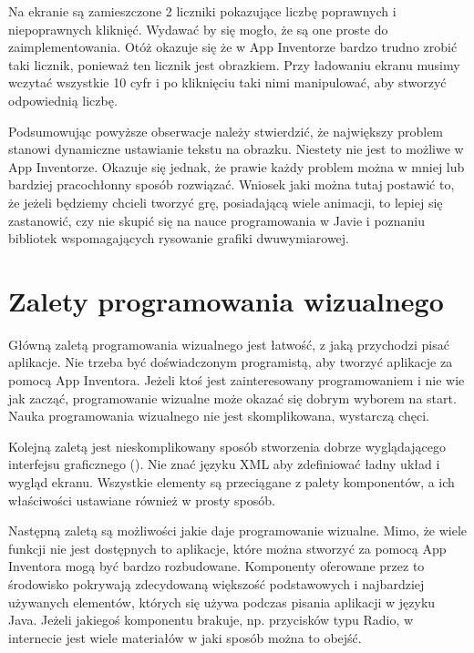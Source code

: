 Na ekranie są zamieszczone 2 liczniki pokazujące liczbę poprawnych i niepoprawnych kliknięć. Wydawać by się mogło, że są one proste do zaimplementowania. Otóż okazuje się że w App Inventorze bardzo trudno zrobić taki licznik, ponieważ ten licznik jest obrazkiem. Przy ładowaniu ekranu musimy wczytać wszystkie 10 cyfr i po kliknięciu taki nimi manipulować, aby stworzyć odpowiednią liczbę.

Podsumowując powyższe obserwacje należy stwierdzić, że największy problem stanowi dynamiczne ustawianie tekstu na obrazku. Niestety nie jest to możliwe w App Inventorze. Okazuje się jednak, że prawie każdy problem można w mniej lub bardziej pracochłonny sposób rozwiązać. Wniosek jaki można tutaj postawić to, że jeżeli będziemy chcieli tworzyć grę, posiadającą wiele animacji, to lepiej się zastanowić, czy nie skupić się na nauce programowania w Javie i poznaniu bibliotek wspomagających rysowanie grafiki dwuwymiarowej.







\section{Zalety programowania wizualnego}

Główną zaletą programowania wizualnego jest łatwość, z jaką przychodzi pisać aplikacje. Nie trzeba być doświadczonym programistą, aby tworzyć aplikacje za pomocą App Inventora. Jeżeli ktoś jest zainteresowany programowaniem i nie wie jak zacząć, programowanie wizualne może okazać się dobrym wyborem na start. Nauka programowania wizualnego nie jest skomplikowana, wystarczą chęci. 

Kolejną zaletą jest nieskomplikowany sposób stworzenia dobrze wyglądającego interfejsu graficznego (). Nie znać języku XML aby zdefiniować ładny układ i wygląd ekranu. Wszystkie elementy są przeciągane z palety komponentów, a ich właściwości ustawiane również w prosty sposób.

Następną zaletą są możliwości jakie daje programowanie wizualne. Mimo, że wiele funkcji nie jest dostępnych to aplikacje, które można stworzyć za pomocą App Inventora mogą być bardzo rozbudowane. Komponenty oferowane przez to środowisko pokrywają zdecydowaną większość podstawowych i najbardziej używanych elementów, których się używa podczas pisania aplikacji w języku Java. Jeżeli jakiegoś komponentu brakuje, np. przycisków typu Radio, w internecie jest wiele materiałów w jaki sposób można to obejść.

